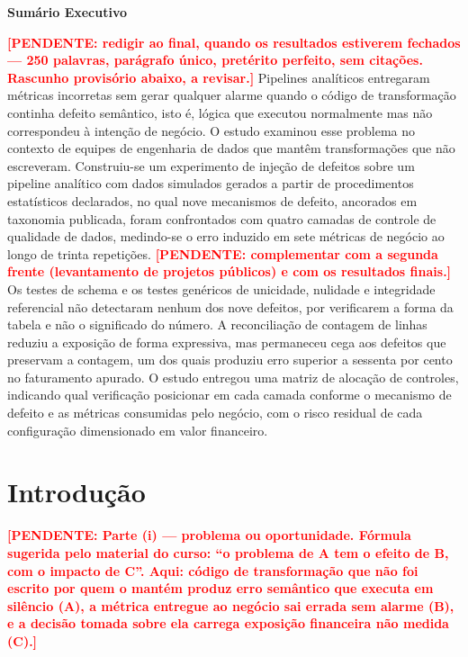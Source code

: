 \documentclass[11pt,a4paper]{article}
\newenvironment{sumarioexecutivo}
  {\par\vspace{\baselineskip}%
   \noindent\textbf{Sumário Executivo}\par\vspace{\baselineskip}%
   \begingroup\singlespacing\setlength{\parindent}{0pt}}
  {\par\endgroup\vspace{\baselineskip}}
\newcommand{\pend}[1]{\textcolor{red}{\textbf{[PENDENTE: #1]}}}
\begin{document}
\begin{sumarioexecutivo}
\pend{redigir ao final, quando os resultados estiverem fechados --- 250
palavras, parágrafo único, pretérito perfeito, sem citações. Rascunho
provisório abaixo, a revisar.}
Pipelines analíticos entregaram métricas incorretas sem gerar qualquer
alarme quando o código de transformação continha defeito semântico, isto
é, lógica que executou normalmente mas não correspondeu à intenção de
negócio. O estudo examinou esse problema no contexto de equipes de
engenharia de dados que mantêm transformações que não escreveram.
Construiu-se um experimento de injeção de defeitos sobre um pipeline
analítico com dados simulados gerados a partir de procedimentos
estatísticos declarados, no qual nove mecanismos de defeito, ancorados em
taxonomia publicada, foram confrontados com quatro camadas de controle de
qualidade de dados, medindo-se o erro induzido em sete métricas de
negócio ao longo de trinta repetições. \pend{complementar com a segunda
frente (levantamento de projetos públicos) e com os resultados finais.}
Os testes de schema e os testes genéricos de unicidade, nulidade e
integridade referencial não detectaram nenhum dos nove defeitos, por
verificarem a forma da tabela e não o significado do número. A
reconciliação de contagem de linhas reduziu a exposição de forma
expressiva, mas permaneceu cega aos defeitos que preservam a contagem, um
dos quais produziu erro superior a sessenta por cento no faturamento
apurado. O estudo entregou uma matriz de alocação de controles, indicando
qual verificação posicionar em cada camada conforme o mecanismo de
defeito e as métricas consumidas pelo negócio, com o risco residual de
cada configuração dimensionado em valor financeiro.
\end{sumarioexecutivo}

\section{Introdução}

\pend{Parte (i) --- problema ou oportunidade. Fórmula sugerida pelo
material do curso: ``o problema de A tem o efeito de B, com o impacto de
C''. Aqui: código de transformação que não foi escrito por quem o mantém
produz erro semântico que executa em silêncio (A), a métrica entregue ao
negócio sai errada sem alarme (B), e a decisão tomada sobre ela carrega
exposição financeira não medida (C).}
\end{document}
